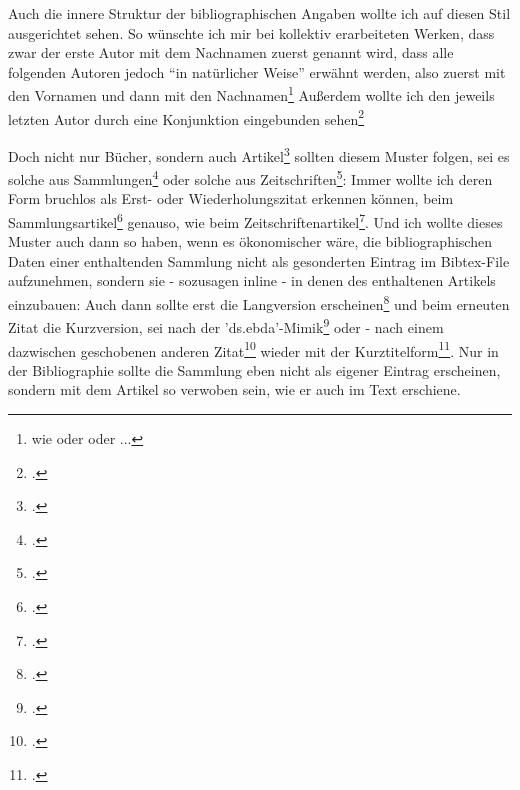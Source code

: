 Auch die innere Struktur der bibliographischen Angaben wollte ich auf diesen Stil
ausgerichtet sehen. So wünschte ich mir bei kollektiv erarbeiteten Werken, dass
zwar der erste Autor mit dem Nachnamen zuerst genannt wird, dass alle folgenden
Autoren jedoch "`in natürlicher Weise"' erwähnt werden, also zuerst mit den
Vornamen und dann mit den Nachnamen\footnote{ wie \cite[hier bei:][]{Woods1991a}
oder \cite[hier bei:][]{RusNor2004a} oder ...} Außerdem wollte ich den jeweils
letzten Autor durch eine Konjunktion eingebunden sehen\footcite[... hier
bei:][]{SegEvaTay2009a}

Doch nicht nur Bücher, sondern auch Artikel\footcite[vgl. z.B.][]{Hays1985a}
sollten diesem Muster folgen, sei es solche aus Sammlungen\footcite[s.
etwa][]{Brachman1985a} oder solche aus Zeitschriften\footcite[s.
etwa][]{McCarthy1980a}: Immer wollte ich deren Form bruchlos als Erst- oder
Wiederholungszitat erkennen können, beim Sammlungsartikel\footcite[vgl.
erneut][]{Hays1985a} genauso, wie beim Zeitschriftenartikel\footcite[s.
nochmals][]{McCarthy1980a}. Und ich wollte dieses Muster auch dann so haben,
wenn es ökonomischer wäre, die bibliographischen Daten einer enthaltenden
Sammlung nicht als gesonderten Eintrag im Bibtex-File aufzunehmen, sondern sie -
sozusagen inline - in denen des enthaltenen Artikels einzubauen: Auch dann
sollte erst die Langversion erscheinen\footcite[vgl.][23]{RotCum2011a} und beim
erneuten Zitat die Kurzversion, sei nach der
'ds.ebda'-Mimik\footcite[vgl.][23]{RotCum2011a} oder - nach einem dazwischen
geschobenen anderen Zitat\footcite[vgl.][9]{KantKdU1974} wieder mit der
Kurztitelform\footcite[vgl.][23]{RotCum2011a}. Nur in der Bibliographie sollte
die Sammlung eben nicht als eigener Eintrag erscheinen, sondern mit dem Artikel
so verwoben sein, wie er auch im Text erschiene.

%
